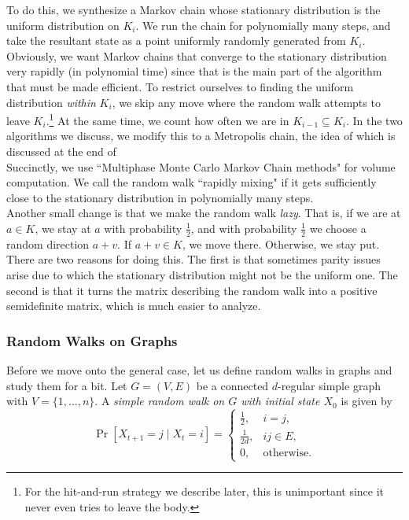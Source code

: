 To do this, we synthesize a Markov chain whose stationary distribution is the uniform distribution on $K_i$. We run the chain for polynomially many steps, and take the resultant state as a point uniformly randomly generated from $K_i$.\\

Obviously, we want Markov chains that converge to the stationary distribution very rapidly (in polynomial time) since that is the main part of the algorithm that must be made efficient. To restrict ourselves to finding the uniform distribution \textit{within} $K_i$, we skip any move where the random walk attempts to leave $K_i$.\footnote{For the hit-and-run strategy we describe later, this is unimportant since it never even tries to leave the body.} At the same time, we count how often we are in $K_{i-1}\subseteq K_i$. In the two algorithms we discuss, we modify this to a Metropolis chain, the idea of which is discussed at the end of  \\

Succinctly, we use ``Multiphase Monte Carlo Markov Chain methods" for volume computation. We call the random walk ``rapidly mixing" if it gets sufficiently close to the stationary distribution in polynomially many steps.\\

Another small change is that we make the random walk \textit{lazy}. That is, if we are at $a\in K$,  we stay at $a$ with probability $\frac{1}{2}$, and with probability $\frac{1}{2}$ we choose a random direction $a+v$. If $a+v\in K$, we move there. Otherwise, we stay put. There are two reasons for doing this. The first is that sometimes parity issues arise due to which the stationary distribution might not be the uniform one. The second is that it turns the matrix describing the random walk into a positive semidefinite matrix, which is much easier to analyze.

\subsubsection{Random Walks on Graphs}

Before we move onto the general case, let us define random walks in graphs and study them for a bit. Let $G=(V,E)$ be a connected $d$-regular simple graph with $V=\{1,\ldots,n\}$. A \textit{simple random walk on $G$ with initial state $X_0$} is given by
\[
\Pr[X_{t+1}=j\mid X_t=i] = 
\begin{cases}
\frac{1}{2}, & i=j, \\
\frac{1}{2d}, & ij\in E, \\
0, & \text{otherwise.}
\end{cases}
\]

